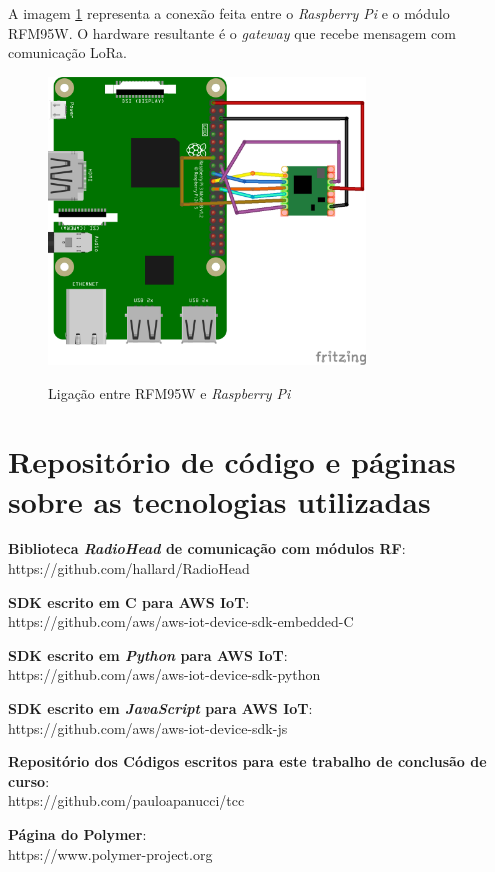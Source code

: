 \documentclass[
    hidelinks,
	12pt,				%
	openany,
	oneside, 
	a4paper,			%
	english,			%
	french,				%
	spanish,			%
	brazil				%
	]{abntex2}
\begin{document}
\begin{anexosenv}
A imagem \ref{fig:rpiwire} representa a conexão feita entre o \textit{Raspberry Pi} e o  módulo RFM95W. O hardware resultante é o \textit{gateway} que recebe mensagem com comunicação LoRa.
\begin{figure}[ht]
    \centering
    \caption{Ligação entre RFM95W e \textit{Raspberry Pi}}
    \includegraphics[width=0.75\textwidth]{rpiwire.png}
    \label{fig:rpiwire}
\end{figure}

\chapter{Repositório de código e páginas sobre as tecnologias utilizadas} \label{anexosoftware}

\textbf{Biblioteca \textit{RadioHead} de comunicação com módulos RF}: 
\\
https://github.com/hallard/RadioHead

\textbf{SDK escrito em C para AWS IoT}: 
\\
https://github.com/aws/aws-iot-device-sdk-embedded-C

\textbf{SDK escrito em \textit{Python} para AWS IoT}:  
\\
https://github.com/aws/aws-iot-device-sdk-python

\textbf{SDK escrito em \textit{JavaScript} para AWS IoT}:  
\\
https://github.com/aws/aws-iot-device-sdk-js

\textbf{Repositório dos Códigos escritos para este trabalho de conclusão de curso}:
\\
https://github.com/pauloapanucci/tcc

\textbf{Página do Polymer}: 
\\
https://www.polymer-project.org



\end{anexosenv}
%
\end{document}
